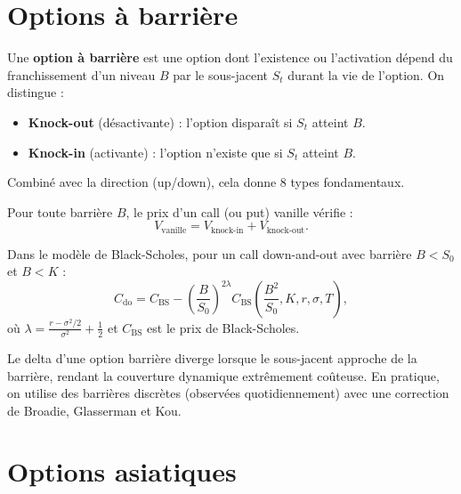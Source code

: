 \section{Options \`a barri\`ere}

\begin{definition}
Une \textbf{option \`a barri\`ere} est une option dont l'existence ou
l'activation d\'epend du franchissement d'un niveau $B$ par le sous-jacent
$S_t$ durant la vie de l'option. On distingue :
\begin{itemize}
    \item \textbf{Knock-out} (d\'esactivante) : l'option dispara\^it si $S_t$
    atteint $B$.
    \item \textbf{Knock-in} (activante) : l'option n'existe que si $S_t$
    atteint $B$.
\end{itemize}
Combin\'e avec la direction (up/down), cela donne 8 types fondamentaux.
\end{definition}

\begin{theoreme}
Pour toute barri\`ere $B$, le prix d'un call (ou put) vanille v\'erifie :
\[
    V_{\mathrm{vanille}} = V_{\mathrm{knock\text{-}in}} + V_{\mathrm{knock\text{-}out}}.
\]
\end{theoreme}

\begin{theoreme}
Dans le mod\`ele de Black-Scholes, pour un call down-and-out avec barri\`ere
$B < S_0$ et $B < K$ :
\[
    C_{\mathrm{do}} = C_{\mathrm{BS}} - \left(\frac{B}{S_0}\right)^{2\lambda}
    C_{\mathrm{BS}}\!\left(\frac{B^2}{S_0}, K, r, \sigma, T\right),
\]
o\`u $\lambda = \frac{r - \sigma^2/2}{\sigma^2} + \frac{1}{2}$ et
$C_{\mathrm{BS}}$ est le prix de Black-Scholes.
\end{theoreme}

\begin{attention}[title=\textbf{Risque de couverture des barri\`eres}]
Le delta d'une option barri\`ere diverge lorsque le sous-jacent approche de la
barri\`ere, rendant la couverture dynamique extr\^emement co\^uteuse. En
pratique, on utilise des barri\`eres discr\`etes (observ\'ees quotidiennement)
avec une correction de Broadie, Glasserman et Kou.
\end{attention}

\section{Options asiatiques}

